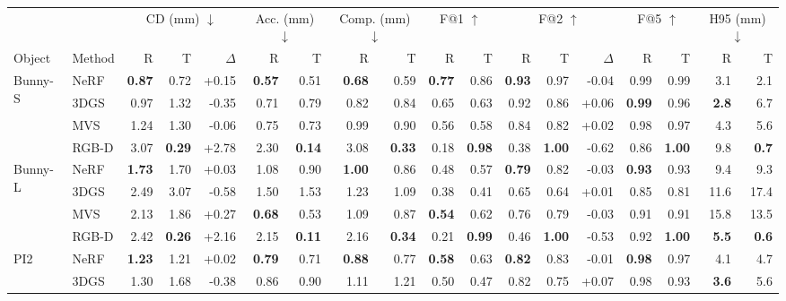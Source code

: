 \begin{tabular}{llrrrrrrrrrrrrrrrr}
\toprule
& & \multicolumn{3}{c}{CD (mm) $\downarrow$} & \multicolumn{2}{c}{Acc. (mm) $\downarrow$} & \multicolumn{2}{c}{Comp. (mm) $\downarrow$} & \multicolumn{2}{c}{F@1 $\uparrow$} & \multicolumn{3}{c}{F@2 $\uparrow$} & \multicolumn{2}{c}{F@5 $\uparrow$} & \multicolumn{2}{c}{H95 (mm) $\downarrow$} \\
\cmidrule(lr){3-5} \cmidrule(lr){6-7} \cmidrule(lr){8-9} \cmidrule(lr){10-11} \cmidrule(lr){12-14} \cmidrule(lr){15-16} \cmidrule(lr){17-18}
Object & Method & R & T & $\Delta$ & R & T & R & T & R & T & R & T & $\Delta$ & R & T & R & T \\
\midrule
\multirow{4}{*}{Bunny-S} & NeRF & \textbf{0.87} & 0.72 & +0.15 & \textbf{0.57} & 0.51 & \textbf{0.68} & 0.59 & \textbf{0.77} & 0.86 & \textbf{0.93} & 0.97 & -0.04 & 0.99 & 0.99 & 3.1 & 2.1 \\
 & 3DGS & 0.97 & 1.32 & -0.35 & 0.71 & 0.79 & 0.82 & 0.84 & 0.65 & 0.63 & 0.92 & 0.86 & +0.06 & \textbf{0.99} & 0.96 & \textbf{2.8} & 6.7 \\
 & MVS & 1.24 & 1.30 & -0.06 & 0.75 & 0.73 & 0.99 & 0.90 & 0.56 & 0.58 & 0.84 & 0.82 & +0.02 & 0.98 & 0.97 & 4.3 & 5.6 \\
 & RGB-D & 3.07 & \textbf{0.29} & +2.78 & 2.30 & \textbf{0.14} & 3.08 & \textbf{0.33} & 0.18 & \textbf{0.98} & 0.38 & \textbf{1.00} & -0.62 & 0.86 & \textbf{1.00} & 9.8 & \textbf{0.7} \\
\midrule
\multirow{4}{*}{Bunny-L} & NeRF & \textbf{1.73} & 1.70 & +0.03 & 1.08 & 0.90 & \textbf{1.00} & 0.86 & 0.48 & 0.57 & \textbf{0.79} & 0.82 & -0.03 & \textbf{0.93} & 0.93 & 9.4 & 9.3 \\
 & 3DGS & 2.49 & 3.07 & -0.58 & 1.50 & 1.53 & 1.23 & 1.09 & 0.38 & 0.41 & 0.65 & 0.64 & +0.01 & 0.85 & 0.81 & 11.6 & 17.4 \\
 & MVS & 2.13 & 1.86 & +0.27 & \textbf{0.68} & 0.53 & 1.09 & 0.87 & \textbf{0.54} & 0.62 & 0.76 & 0.79 & -0.03 & 0.91 & 0.91 & 15.8 & 13.5 \\
 & RGB-D & 2.42 & \textbf{0.26} & +2.16 & 2.15 & \textbf{0.11} & 2.16 & \textbf{0.34} & 0.21 & \textbf{0.99} & 0.46 & \textbf{1.00} & -0.53 & 0.92 & \textbf{1.00} & \textbf{5.5} & \textbf{0.6} \\
\midrule
\multirow{4}{*}{PI2} & NeRF & \textbf{1.23} & 1.21 & +0.02 & \textbf{0.79} & 0.71 & \textbf{0.88} & 0.77 & \textbf{0.58} & 0.63 & \textbf{0.82} & 0.83 & -0.01 & \textbf{0.98} & 0.97 & 4.1 & 4.7 \\
 & 3DGS & 1.30 & 1.68 & -0.38 & 0.86 & 0.90 & 1.11 & 1.21 & 0.50 & 0.47 & 0.82 & 0.75 & +0.07 & 0.98 & 0.93 & \textbf{3.6} & 5.6 \\

\end{tabular}
